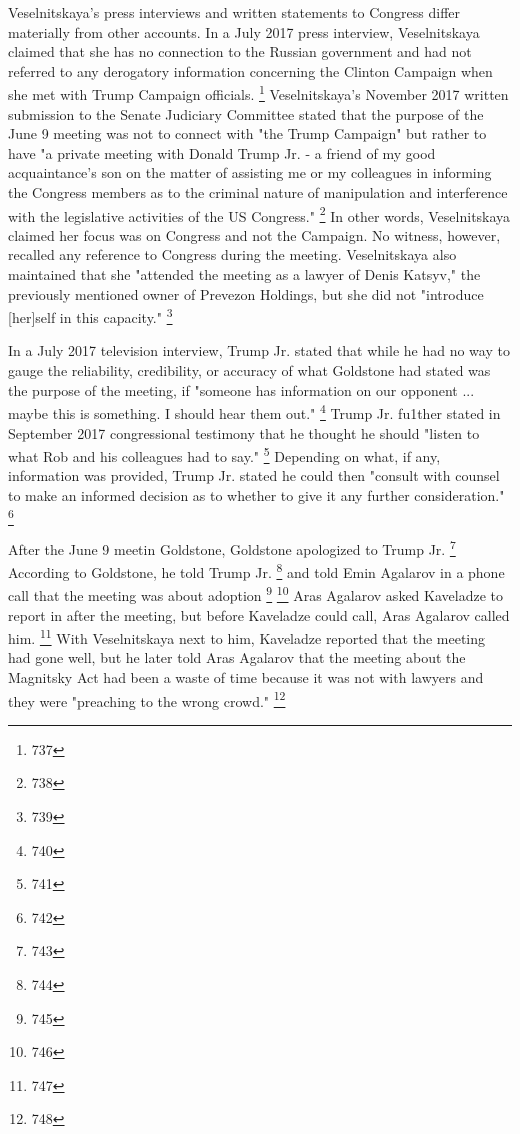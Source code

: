 Veselnitskaya's press interviews and written statements to Congress differ materially from other accounts.
In a July 2017 press interview, Veselnitskaya claimed that she has no connection to the Russian government and had not referred to any derogatory information concerning the Clinton Campaign when she met with Trump Campaign officials.%
\footnote{737}
Veselnitskaya's November 2017 written submission to the Senate Judiciary Committee stated that the purpose of the June 9 meeting was not to connect with "the Trump Campaign" but rather to have "a private meeting with Donald Trump Jr. - a friend of my good acquaintance's son on the matter of assisting me or my colleagues in informing the Congress members as to the criminal nature of manipulation and interference with the legislative activities of the US Congress."%
\footnote{738}
In other words, Veselnitskaya claimed her focus was on Congress and not the Campaign.
No witness, however, recalled any reference to Congress during the meeting.
Veselnitskaya also maintained that she "attended the meeting as a lawyer of Denis Katsyv," the previously mentioned owner of Prevezon Holdings, but she did not "introduce [her]self in this capacity."%
\footnote{739}

In a July 2017 television interview, Trump Jr. stated that while he had no way to gauge the reliability, credibility, or accuracy of what Goldstone had stated was the purpose of the meeting, if "someone has information on our opponent ... maybe this is something.
I should hear them out."%
\footnote{740}
Trump Jr. fu1ther stated in September 2017 congressional testimony that he thought he should "listen to what Rob and his colleagues had to say."%
\footnote{741}
Depending on what, if any, information was provided, Trump Jr. stated he could then "consult with counsel to make an informed decision as to whether to give it any further consideration."%
\footnote{742}

After the June 9 meetin Goldstone, Goldstone apologized to Trump Jr.%
\footnote{743}
According to Goldstone, he told Trump Jr.
\footnote{744}
and told Emin Agalarov in a phone call that the meeting was about adoption
\footnote{745}
\footnote{746}
Aras Agalarov asked Kaveladze to report in after the meeting, but before Kaveladze could call, Aras Agalarov called him.%
\footnote{747}
With Veselnitskaya next to him, Kaveladze reported that the meeting had gone well, but he later told Aras Agalarov that the meeting about the Magnitsky Act had been a waste of time because it was not with lawyers and they were "preaching to the wrong crowd."%
\footnote{748}

